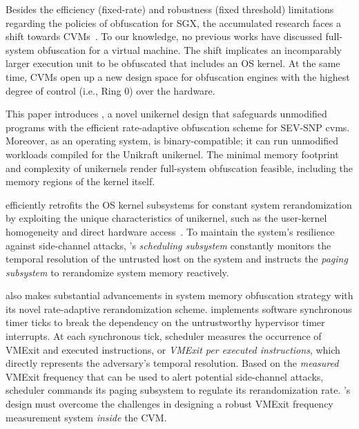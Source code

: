  Besides the efficiency (fixed-rate) and robustness (fixed threshold) limitations regarding the policies of obfuscation for SGX, the accumulated research faces a shift towards CVMs~\cite{adil2024veil,schwarz2024seven,narayanan2024vtpm,anna2023trustworthy,li2023bifrost}.
To our knowledge, no previous works have discussed full-system obfuscation for a virtual machine.
The shift implicates an incomparably larger execution unit to be obfuscated that includes an OS kernel.
At the same time, CVMs open up a new design space for obfuscation engines with the highest degree of control (i.e., Ring 0) over the hardware.

This paper introduces \textbf{\thename}, a novel unikernel design that safeguards unmodified programs with the efficient rate-adaptive obfuscation scheme for SEV-SNP \glspl{cvm}.
Moreover, as an operating system, \thename is binary-compatible; it can run unmodified workloads compiled for the Unikraft unikernel.
The minimal memory footprint and complexity of unikernels render full-system obfuscation feasible, including the memory regions of the kernel itself.

\thename efficiently retrofits the OS kernel subsystems for constant system rerandomization by exploiting the unique characteristics of unikernel, such as the user-kernel homogeneity and direct hardware access~\cite{belay2012dune,unikraft}.
To maintain the system's resilience against side-channel attacks, \thename's \emph{scheduling subsystem} constantly monitors the temporal resolution of the untrusted host on the system and instructs the \emph{paging subsystem} to rerandomize system memory reactively.


\thename also makes substantial advancements in system memory obfuscation strategy with its novel rate-adaptive rerandomization scheme.
\thename implements software synchronous timer ticks to break the dependency on the untrustworthy hypervisor timer interrupts.
At each synchronous tick, \thename scheduler measures the occurrence of VMExit and executed instructions, or \emph{VMExit per executed instructions}, which directly represents the adversary's temporal resolution.
Based on the \emph{measured} VMExit frequency that can be used to alert potential side-channel attacks, \thename scheduler commands its paging subsystem to regulate its rerandomization rate.
\thename's design must overcome the challenges in designing a robust VMExit frequency measurement system \emph{inside} the CVM.

